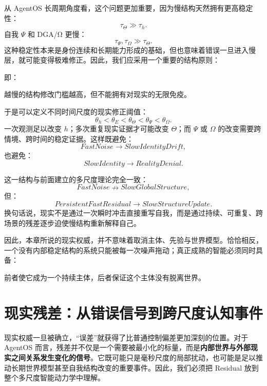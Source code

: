 从 AgentOS 长周期角度看，这个问题更加重要，因为慢结构天然拥有更高稳定性：
\[
\tau_\Theta
\gg
\tau_h.
\]
自我 $\Psi$ 和 DGA/Ω 更慢：
\[
\tau_\Psi,\tau_\Omega
\gg
\tau_\Theta.
\]
这种稳定性本来是身份连续和长期能力形成的基础，但也意味着错误一旦进入慢层，就可能变得极难修正。因此，我们应采用一个重要的结构原则：
\begin{statementbox}
\centering
{}
\end{statementbox}
即：

\begin{statementbox}
越慢的结构修改门槛越高，但不能拥有对现实的无限免疫。
\end{statementbox}

于是可以定义不同时间尺度的现实修正阈值：
\[
\theta_h
<
\theta_E
<
\theta_\Theta
<
\theta_\Psi
<
\theta_\Omega.
\]
一次观测足以改变 $h$；多次重复现实证据才可能改变 $\Theta$；而 $\Psi$ 或 $\Omega$ 的改变需要跨情境、跨时间的稳定证据。这样既避免：
\[
FastNoise\rightarrow SlowIdentityDrift,
\]
也避免：
\[
SlowIdentity\rightarrow RealityDenial.
\]

这一结构与前面建立的多尺度理论完全一致：
\[
FastNoise
\nrightarrow
SlowGlobalStructure,
\]
但：
\[
PersistentFastResidual
\rightarrow
SlowStructureUpdate.
\]
换句话说，现实不是通过一次瞬时冲击直接重写自我，而是通过持续、可重复、跨场景的残差逐步迫使慢结构重新解释自己。

因此，本章所说的现实权威，并不意味着取消主体、先验与世界模型。恰恰相反，一个没有内部稳定结构的系统只能被每一次噪声拖动；真正成熟的智能必须同时具备：
\begin{statementbox}
\centering
{}
\end{statementbox}
前者使它成为一个持续主体，后者保证这个主体没有脱离世界。

\section{现实残差：从错误信号到跨尺度认知事件}

现实权威一旦被确立，``误差''就获得了比普通控制偏差更加深刻的位置。对于 AgentOS 而言，残差并不仅是一个需要被最小化的标量，而是\textbf{内部世界与外部现实之间关系发生变化的信号}。它既可能只是毫秒尺度的局部扰动，也可能是足以推动长期世界模型甚至自我结构改变的重要事件。因此，我们必须把 Residual 放到整个多尺度智能动力学中理解。

